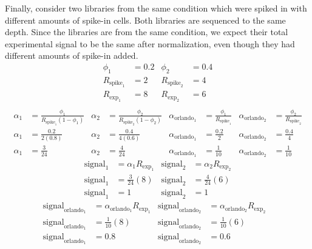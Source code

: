 Finally, consider two libraries from the same condition which were spiked in with different amounts of spike-in cells.
Both libraries are sequenced to the same depth.
Since the libraries are from the same condition, we expect their total experimental signal to be the same after normalization, even though they had different amounts of spike-in added.
\begin{align*}
    \phi_1 &= 0.2 & \phi_2 &=0.4 \\
    R_{\text{spike}_1} &= 2 & R_{\text{spike}_2} &= 4 \\
    R_{\text{exp}_1} &= 8 & R_{\text{exp}_2} &= 6 \\
\end{align*}
\begin{align*}
    \alpha_1 &= \frac{\phi_1}{R_{\text{spike}_1} \left(1-\phi_1 \right)} &
    \alpha_2 &= \frac{\phi_2}{R_{\text{spike}_2} \left(1-\phi_2 \right)} &
    \alpha_{\text{orlando}_1} &= \frac{\phi_1}{R_{\text{spike}_1}} &
    \alpha_{\text{orlando}_2} &= \frac{\phi_2}{R_{\text{spike}_2}} \\
    \alpha_1 &= \frac{0.2}{2 \left(0.8 \right)} &
    \alpha_2 &= \frac{0.4}{4 \left(0.6 \right)} &
    \alpha_{\text{orlando}_1} &= \frac{0.2}{2} &
    \alpha_{\text{orlando}_2} &= \frac{0.4}{4} \\
    \alpha_1 &= \frac{3}{24} &
    \alpha_2 &= \frac{4}{24} &
    \alpha_{\text{orlando}_1} &= \frac{1}{10} &
    \alpha_{\text{orlando}_2} &= \frac{1}{10}
\end{align*}
\begin{align*}
    \text{signal}_1 &= \alpha_1 R_{\text{exp}_1}  &
    \text{signal}_2 &= \alpha_2 R_{\text{exp}_2}  \\
    \text{signal}_1 &=  \frac{3}{24} \left(8 \right)  &
    \text{signal}_2 &=  \frac{4}{24} \left(6 \right)  \\
    \text{signal}_1 &=  1 &
    \text{signal}_2 &=  1
\end{align*}
\begin{align*}
    \text{signal}_{\text{orlando}_1} &= \alpha_{\text{orlando}_1} R_{\text{exp}_1} &
    \text{signal}_{\text{orlando}_2} &= \alpha_{\text{orlando}_2} R_{\text{exp}_2} & \\
    \text{signal}_{\text{orlando}_1} &= \frac{1}{10} \left(8\right) &
    \text{signal}_{\text{orlando}_2} &= \frac{1}{10} \left(6\right) & \\
    \text{signal}_{\text{orlando}_1} &= 0.8 &
    \text{signal}_{\text{orlando}_2} &= 0.6
\end{align*}

